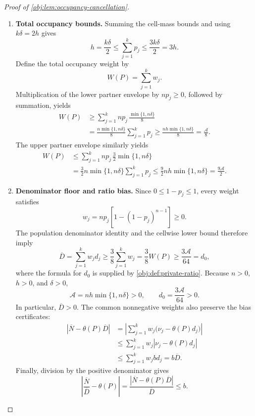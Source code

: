 \documentclass[11pt]{article}
\begin{document}
\begin{proof}[Proof of \cref{obj:lem:occupancy-cancellation}]
\begin{enumerate}
\item \textbf{Total occupancy bounds.}
Summing the cell-mass bounds and using \(k\delta=2h\) gives
\[
h=\frac{k\delta}{2}
\le\sum_{j=1}^k p_j
\le\frac{3k\delta}{2}=3h.
\]
Define the total occupancy weight by
\[
W(P)=\sum_{j=1}^k w_j.
\]
Multiplication of the lower partner envelope by \(np_j\ge0\), followed by summation, yields
\[
\begin{aligned}
W(P)
&\ge
\sum_{j=1}^k np_j\,
 \frac{\min\{1,n\delta\}}8\\
&=
\frac{n\min\{1,n\delta\}}8\sum_{j=1}^k p_j
\ge\frac{nh\min\{1,n\delta\}}8
=\frac{\mathcal A}{8}.
\end{aligned}
\]
The upper partner envelope similarly yields
\[
\begin{aligned}
W(P)
&\le
\sum_{j=1}^k np_j\,
 \frac32\min\{1,n\delta\}\\
&=
\frac32n\min\{1,n\delta\}\sum_{j=1}^k p_j
\le\frac92nh\min\{1,n\delta\}
=\frac{9\mathcal A}{2}.
\end{aligned}
\]

\item \textbf{Denominator floor and ratio bias.}
Since \(0\le1-p_j\le1\), every weight satisfies
\[
w_j=np_j\left[1-(1-p_j)^{n-1}\right]\ge0.
\]
The population denominator identity and the cellwise lower bound therefore imply
\[
\overline D
=\sum_{j=1}^k w_jd_j
\ge\frac38\sum_{j=1}^k w_j
=\frac38W(P)
\ge\frac{3\mathcal A}{64}
=d_0,
\]
where the formula for \(d_0\) is supplied by
\cref{obj:def:private-ratio}. Because \(n>0\), \(h>0\), and \(\delta>0\),
\[
\mathcal A=nh\min\{1,n\delta\}>0,
\qquad
d_0=\frac{3\mathcal A}{64}>0.
\]
In particular, \(\overline D>0\). The common nonnegative weights also preserve the bias certificates:
\[
\begin{aligned}
|\overline N-\theta(P)\overline D|
&=
\left|\sum_{j=1}^k
w_j\bigl(\nu_j-\theta(P)d_j\bigr)\right|\\
&\le
\sum_{j=1}^k w_j
 \left|\nu_j-\theta(P)d_j\right|\\
&\le
\sum_{j=1}^k w_jbd_j
=b\overline D.
\end{aligned}
\]
Finally, division by the positive denominator gives
\[
\left|\frac{\overline N}{\overline D}-\theta(P)\right|
=
\frac{|\overline N-\theta(P)\overline D|}{\overline D}
\le b.
\]
\end{enumerate}
\end{proof}
\end{document}

